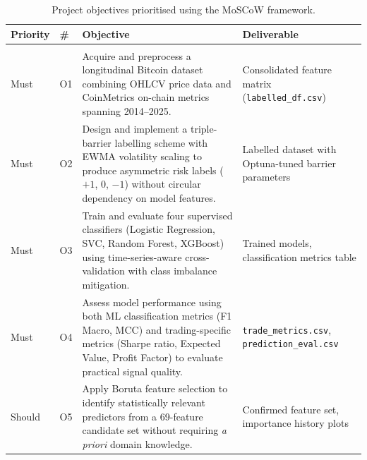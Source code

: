 {
\setlength{\LTleft}{-5pt}
\setlength{\LTright}{\fill}
\setlength{\LTpre}{3pt}
\setlength{\LTpost}{--5pt}
\renewcommand{\arraystretch}{0.85}
\begin{longtable}{|
    >{\raggedright\arraybackslash\leftskip=-4.5pt}p{} |
    >{\raggedright\arraybackslash\leftskip=-4.5pt}p{} |
    >{\raggedright\arraybackslash\leftskip=-4.5pt}p{} |
    >{\raggedright\arraybackslash\leftskip=-4.5pt}p{}|}
\caption{Project objectives prioritised using the MoSCoW framework.\label{tab:moscow}} \\
\hline
\textbf{Priority} &
\textbf{\#} &
\textbf{Objective} &
\textbf{Deliverable} \\
\hline
\endfirsthead

\hline \multicolumn{4}{r}{Continued on next page} \\
\endfoot
\hline
\endlastfoot

Must & O1 &
Acquire and preprocess a longitudinal Bitcoin dataset combining OHLCV price data and CoinMetrics on-chain metrics spanning 2014--2025. &
Consolidated feature matrix (\texttt{labelled\_df.csv}) \\ \hline

Must & O2 &
Design and implement a triple-barrier labelling scheme with EWMA volatility scaling to produce asymmetric risk labels ($+1$, $0$, $-1$) without circular dependency on model features. &
Labelled dataset with Optuna-tuned barrier parameters \\ \hline

Must & O3 &
Train and evaluate four supervised classifiers (Logistic Regression, SVC, Random Forest, XGBoost) using time-series-aware cross-validation with class imbalance mitigation. &
Trained models, classification metrics table \\ \hline

Must & O4 &
Assess model performance using both ML classification metrics (F1 Macro, MCC) and trading-specific metrics (Sharpe ratio, Expected Value, Profit Factor) to evaluate practical signal quality. &
\texttt{trade\_metrics.csv}, \texttt{prediction\_eval.csv} \\ \hline

Should & O5 &
Apply Boruta feature selection to identify statistically relevant predictors from a 69-feature candidate set without requiring \textit{a priori} domain knowledge. &
Confirmed feature set, importance history plots \\ \hline


\end{longtable}}
